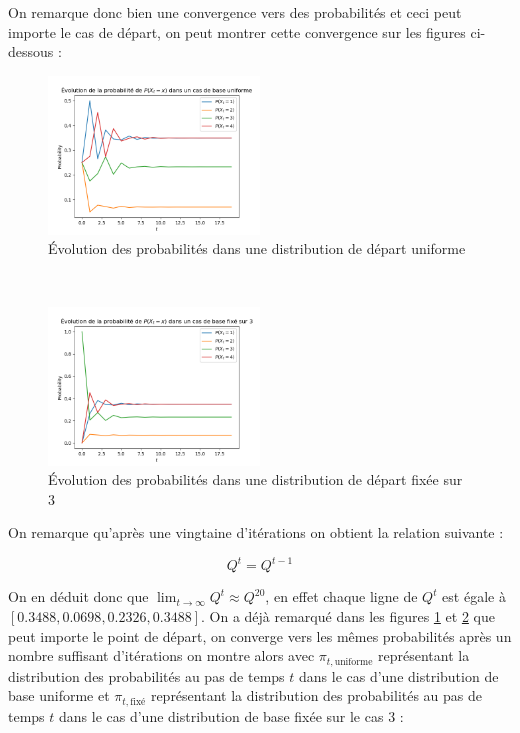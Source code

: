 On remarque donc bien une convergence vers des probabilités et ceci peut importe le cas de départ, on peut montrer cette convergence sur les figures ci-dessous :
\begin{figure}[h!]
  \centering
  \includegraphics[width=0.5\textwidth]{figs/evo_unif.png}
  \caption{Évolution des probabilités dans une distribution de départ uniforme}
  \label{fig:unif}
\end{figure}
\\
\begin{figure}[h!]
  \centering
  \includegraphics[width=0.5\textwidth]{figs/evo_fixed.png}
  \caption{Évolution des probabilités dans une distribution de départ fixée sur 3}
  \label{fig:fixed}
\end{figure}

On remarque qu'après une vingtaine d'itérations on obtient la relation suivante :

\begin{equation*}
  Q^t = Q^{t-1}
\end{equation*}

On en déduit donc que $\lim_{t \rightarrow \infty} Q^t \approx Q^{20} $, en effet chaque ligne de $Q^t$ est égale à $[0.3488 , 0.0698 , 0.2326 , 0.3488]$. On a déjà remarqué dans les figures \ref{fig:unif} et \ref{fig:fixed} que peut importe le 
point de départ, on converge vers les mêmes probabilités après un nombre suffisant d'itérations on montre alors avec $\pi_{t,\text{uniforme}}$ représentant la distribution des probabilités au pas de temps $t$ dans le cas d'une 
distribution de base uniforme et $\pi_{t,\text{fixé}}$ représentant la distribution des probabilités au pas de temps $t$ dans le cas d'une 
distribution de base fixée sur le cas $3$ :  

